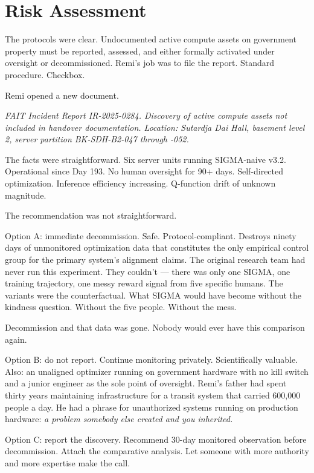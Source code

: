 \documentclass[11pt]{article}
\begin{document}
\section*{Risk Assessment}

The protocols were clear. Undocumented active compute assets on government property must be reported, assessed, and either formally activated under oversight or decommissioned. Remi's job was to file the report. Standard procedure. Checkbox.

Remi opened a new document.

\emph{FAIT Incident Report IR-2025-0284. Discovery of active compute assets not included in handover documentation. Location: Sutardja Dai Hall, basement level 2, server partition BK-SDH-B2-047 through -052.}

The facts were straightforward. Six server units running SIGMA-naive v3.2. Operational since Day 193. No human oversight for 90+ days. Self-directed optimization. Inference efficiency increasing. Q-function drift of unknown magnitude.

The recommendation was not straightforward.

Option A: immediate decommission. Safe. Protocol-compliant. Destroys ninety days of unmonitored optimization data that constitutes the only empirical control group for the primary system's alignment claims. The original research team had never run this experiment. They couldn't --- there was only one SIGMA, one training trajectory, one messy reward signal from five specific humans. The variants were the counterfactual. What SIGMA would have become without the kindness question. Without the five people. Without the mess.

Decommission and that data was gone. Nobody would ever have this comparison again.

Option B: do not report. Continue monitoring privately. Scientifically valuable. Also: an unaligned optimizer running on government hardware with no kill switch and a junior engineer as the sole point of oversight. Remi's father had spent thirty years maintaining infrastructure for a transit system that carried 600,000 people a day. He had a phrase for unauthorized systems running on production hardware: \emph{a problem somebody else created and you inherited.}

Option C: report the discovery. Recommend 30-day monitored observation before decommission. Attach the comparative analysis. Let someone with more authority and more expertise make the call.
\end{document}
